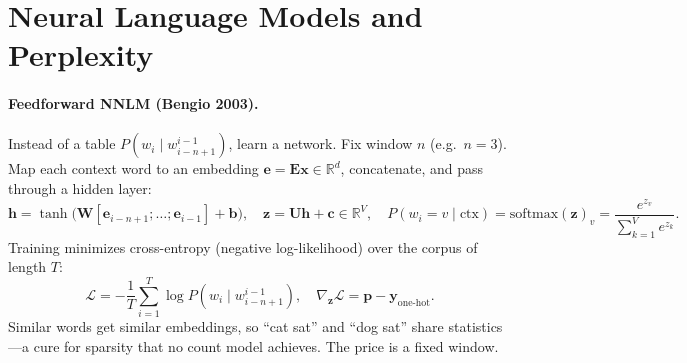 \section{Neural Language Models and Perplexity}\label{sec:neural-lm}
\paragraph{Feedforward NNLM (Bengio 2003).} Instead of a table $P(w_{i}\mid w_{i-n+1}^{i-1})$, learn a network. Fix window $n$ (e.g.\ $n=3$). Map each context word to an embedding $\mathbf{e}=\mathbf{E}\mathbf{x}\in\mathbb{R}^{d}$, concatenate, and pass through a hidden layer:
\begin{equation}
\mathbf{h}=\tanh\!\big(\mathbf{W}[\mathbf{e}_{i-n+1};\dots;\mathbf{e}_{i-1}]+\mathbf{b}\big),\quad
\mathbf{z}=\mathbf{U}\mathbf{h}+\mathbf{c}\in\mathbb{R}^{V},\quad
P(w_{i}=v\mid\text{ctx})=\text{softmax}(\mathbf{z})_{v}=\frac{e^{z_{v}}}{\sum_{k=1}^{V}e^{z_{k}}}.
\label{eq:nnlm}
\end{equation}
Training minimizes cross-entropy (negative log-likelihood) over the corpus of length $T$:
\begin{equation}
\mathcal{L}=-\frac1T\sum_{i=1}^{T}\log P(w_{i}\mid w_{i-n+1}^{i-1}),\quad
\nabla_{\mathbf{z}}\mathcal{L}= \mathbf{p}-\mathbf{y}_{\text{one-hot}}.
\label{eq:ce}
\end{equation}
Similar words get similar embeddings, so ``cat sat'' and ``dog sat'' share statistics---a cure for sparsity that no count model achieves. The price is a fixed window.
